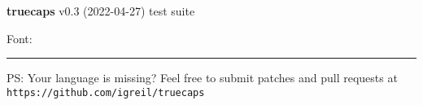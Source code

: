 \documentclass{article}
\begin{document}
\begin{flushright}
	\Large\textbf{truecaps} v0.3 (2022-04-27) test suite\par
	\large Font: 
\end{flushright}


	\def\presection		{\vspace{-1em}}
	\def\postsection	{\vspace{-.5em}\hrule\vspace{.5em}}































\vspace{1em}\hrule\vspace{1em}
\noindent PS: Your language is missing? Feel free to submit patches and pull requests at 
\texttt{https://github.com/igreil/truecaps}
\end{document}
